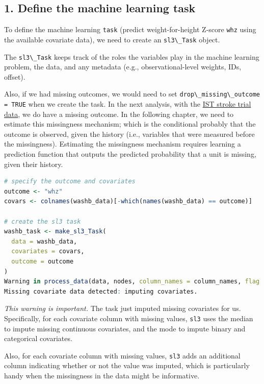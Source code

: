 \documentclass[
  12pt, krantz2,
]{book}
\newcommand{\passthrough}[1]{#1}
\theoremstyle{definition}
\theoremstyle{definition}
\theoremstyle{definition}
\newcommand{\1}{\mathbbm{1}}
\begin{document}
\hypertarget{define-the-machine-learning-task}{%
\subsection*{1. Define the machine learning task}\label{define-the-machine-learning-task}}


To define the machine learning \passthrough{\lstinline!task!} (predict weight-for-height Z-score
\passthrough{\lstinline!whz!} using the available covariate data), we need to create an \passthrough{\lstinline!sl3\_Task!}
object.

The \passthrough{\lstinline!sl3\_Task!} keeps track of the roles the variables play in the machine
learning problem, the data, and any metadata (e.g., observational-level
weights, IDs, offset).

Also, if we had missing outcomes, we would need to set \passthrough{\lstinline!drop\_missing\_outcome = TRUE!} when we create the task. In the next analysis, with the \protect\hyperlink{ist}{IST stroke trial
data}, we do have a missing outcome. In the following chapter, we need to
estimate this missingness mechanism; which is the conditional probably that
the outcome is observed, given the history (i.e., variables that were measured
before the missingness). Estimating the missingness mechanism requires learning
a prediction function that outputs the predicted probability that a unit
is missing, given their history.

\begin{lstlisting}[language=R]
# specify the outcome and covariates
outcome <- "whz"
covars <- colnames(washb_data)[-which(names(washb_data) == outcome)]

# create the sl3 task
washb_task <- make_sl3_Task(
  data = washb_data,
  covariates = covars,
  outcome = outcome
)
Warning in process_data(data, nodes, column_names = column_names, flag = flag, :
Missing covariate data detected: imputing covariates.
\end{lstlisting}

\emph{This warning is important.} The task just imputed missing covariates for us.
Specifically, for each covariate column with missing values, \passthrough{\lstinline!sl3!} uses the
median to impute missing continuous covariates, and the mode to impute binary
and categorical covariates.

Also, for each covariate column with missing values, \passthrough{\lstinline!sl3!} adds an additional
column indicating whether or not the value was imputed, which is particularly
handy when the missingness in the data might be informative.
\end{document}
